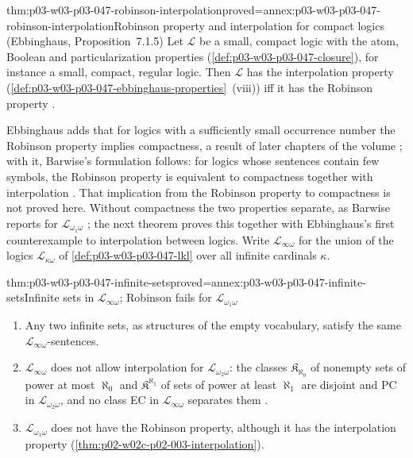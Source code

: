 \begin{hbtheorem}{thm:p03-w03-p03-047-robinson-interpolation}{proved=annex:p03-w03-p03-047-robinson-interpolation}{Robinson property and interpolation for compact logics (Ebbinghaus, Proposition~7.1.5)}
Let \(\mathscr L\) be a small, compact logic with the atom, Boolean and
particularization properties (\cref{def:p03-w03-p03-047-closure}), for
instance a small, compact, regular logic.  Then \(\mathscr L\)
has the interpolation property
(\cref{def:p03-w03-p03-047-ebbinghaus-properties}~(viii)) iff it has the
Robinson property \cite[Ch.~II, Proposition~7.1.5, p.~70]{Ebbinghaus1985ExtendedLogics}.
\end{hbtheorem}

Ebbinghaus adds that for logics with a sufficiently small occurrence number
the Robinson property implies compactness, a result of later chapters of
the volume \cite[Ch.~II, \S7.1, p.~70]{Ebbinghaus1985ExtendedLogics}; with it,
Barwise's formulation follows: for logics whose sentences contain few
symbols, the Robinson property is equivalent to compactness together with
interpolation \cite[Ch.~I, \S2.4, p.~16]{Barwise1985BackgroundAims}.  That
implication from the Robinson property to compactness is not proved here.
Without compactness the two properties separate, as Barwise reports for
\(\mathscr L_{\omega_1\omega}\) \cite[Ch.~I, \S2.3, p.~16]{Barwise1985BackgroundAims};
the next theorem proves this together with Ebbinghaus's first
counterexample to interpolation between logics.  Write
\(\mathscr L_{\infty\omega}\) for the union of the logics
\(\mathscr L_{\kappa\omega}\) of \cref{def:p03-w03-p03-047-lkl} over all
infinite cardinals \(\kappa\).

\begin{hbtheorem}{thm:p03-w03-p03-047-infinite-sets}{proved=annex:p03-w03-p03-047-infinite-sets}{Infinite sets in \(\mathscr L_{\infty\omega}\); Robinson fails for \(\mathscr L_{\omega_1\omega}\)}
\begin{enumerate}
 \item Any two infinite sets, as structures of the empty vocabulary,
       satisfy the same \(\mathscr L_{\infty\omega}\)-sentences.
 \item \(\mathscr L_{\infty\omega}\) does not allow interpolation for
       \(\mathscr L_{\omega_2\omega}\): the classes
       \(\mathfrak K_{\aleph_0}\) of nonempty sets of power at most
       \(\aleph_0\) and \(\mathfrak K^{\aleph_1}\) of sets of power at least
       \(\aleph_1\) are disjoint and PC in \(\mathscr L_{\omega_2\omega}\), and
       no class EC in \(\mathscr L_{\infty\omega}\) separates them
       \cite[Ch.~II, Counterexamples~7.1.3(a), p.~69]{Ebbinghaus1985ExtendedLogics}.
 \item \(\mathscr L_{\omega_1\omega}\) does not have the Robinson property,
       although it has the interpolation property
       (\cref{thm:p02-w02c-p02-003-interpolation}).
\end{enumerate}
\end{hbtheorem}

